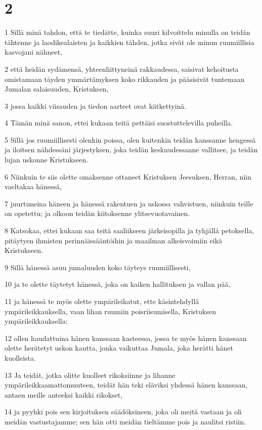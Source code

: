 \chapter{2}

\par 1 Sillä minä tahdon, että te tiedätte, kuinka suuri kilvoittelu minulla on teidän tähtenne ja laodikealaisten ja kaikkien tähden, jotka eivät ole minun ruumiillisia kasvojani nähneet,
\par 2 että heidän sydämensä, yhteenliittyneinä rakkaudessa, saisivat kehoitusta omistamaan täyden ymmärtämyksen koko rikkauden ja pääsisivät tuntemaan Jumalan salaisuuden, Kristuksen,
\par 3 jossa kaikki viisauden ja tiedon aarteet ovat kätkettyinä.
\par 4 Tämän minä sanon, ettei kukaan teitä pettäisi suostuttelevilla puheilla.
\par 5 Sillä jos ruumiillisesti olenkin poissa, olen kuitenkin teidän kanssanne hengessä ja iloitsen nähdessäni järjestyksen, joka teidän keskuudessanne vallitsee, ja teidän lujan uskonne Kristukseen.
\par 6 Niinkuin te siis olette omaksenne ottaneet Kristuksen Jeesuksen, Herran, niin vaeltakaa hänessä,
\par 7 juurtuneina häneen ja hänessä rakentuen ja uskossa vahvistuen, niinkuin teille on opetettu; ja olkoon teidän kiitoksenne ylitsevuotavainen.
\par 8 Katsokaa, ettei kukaan saa teitä saaliikseen järkeisopilla ja tyhjällä petoksella, pitäytyen ihmisten perinnäissääntöihin ja maailman alkeisvoimiin eikä Kristukseen.
\par 9 Sillä hänessä asuu jumaluuden koko täyteys ruumiillisesti,
\par 10 ja te olette täytetyt hänessä, joka on kaiken hallituksen ja vallan pää,
\par 11 ja hänessä te myös olette ympärileikatut, ette käsintehdyllä ympärileikkauksella, vaan lihan ruumiin poisriisumisella, Kristuksen ympärileikkauksella:
\par 12 ollen haudattuina hänen kanssaan kasteessa, jossa te myös hänen kanssaan olette herätetyt uskon kautta, jonka vaikuttaa Jumala, joka herätti hänet kuolleista.
\par 13 Ja teidät, jotka olitte kuolleet rikoksiinne ja lihanne ympärileikkaamattomuuteen, teidät hän teki eläviksi yhdessä hänen kanssaan, antaen meille anteeksi kaikki rikokset,
\par 14 ja pyyhki pois sen kirjoituksen säädöksineen, joka oli meitä vastaan ja oli meidän vastustajamme; sen hän otti meidän tieltämme pois ja naulitsi ristiin.
